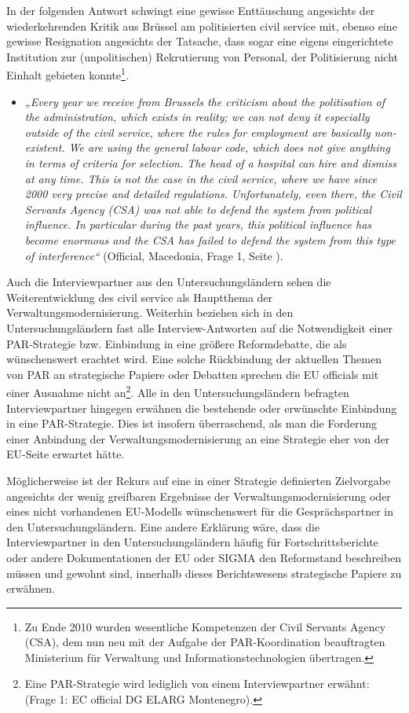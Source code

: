 In der folgenden Antwort schwingt eine gewisse Enttäuschung angesichts der wiederkehrenden Kritik aus Brüssel am politisierten civil service mit, ebenso eine gewisse Resignation angesichts der Tatsache, dass sogar eine eigens eingerichtete Institution zur (unpolitischen) Rekrutierung von Personal, der Politisierung nicht Einhalt gebieten konnte\footnote{Zu Ende 2010 wurden wesentliche Kompetenzen der Civil Servants Agency (CSA), dem nun neu mit der Aufgabe der PAR-Koordination beauftragten Ministerium für Verwaltung und Informationstechnologien übertragen.}. 
\begin{itemize}[label={}]
\item \textit{„Every year we receive from Brussels the criticism about the politisation of the administration, which exists in reality; we can not deny it especially outside of the civil service, where the rules for employment are basically non-existent. We are using the general labour code, which does not give anything in terms of criteria for selection. The head of a hospital can hire and dismiss at any time. This is not the case in the civil service, where we have since 2000 very precise and detailed regulations. Unfortunately, even there, the Civil Servants Agency (CSA) was not able to defend the system from political influence. In particular during the past years, this political influence has become enormous and the CSA has failed to defend the system from this type of interference“} (Official, Macedonia, Frage 1, Seite \pageref{sec:par macedonia}).
\end{itemize}
Auch die Interviewpartner aus den Untersuchungsländern sehen die Weiterentwicklung des civil service als Hauptthema der Verwaltungsmodernisierung. Weiterhin beziehen sich in den Untersuchungsländern fast alle Interview-Antworten auf die Notwendigkeit einer PAR-Strategie bzw. Einbindung in eine größere Reformdebatte, die als wünschenswert erachtet wird. Eine solche Rückbindung der aktuellen Themen von PAR an strategische Papiere oder Debatten sprechen die EU officials mit einer Ausnahme nicht an\footnote{Eine PAR-Strategie wird lediglich von einem Interviewpartner erwähnt: (Frage 1: EC official DG ELARG Montenegro).}. Alle in den Untersuchungsländern befragten Interviewpartner hingegen erwähnen die bestehende oder erwünschte Einbindung in eine PAR-Strategie. Dies ist insofern überraschend, als man die Forderung einer Anbindung der Verwaltungsmodernisierung an eine Strategie eher von der EU-Seite erwartet hätte.\par
Möglicherweise ist der Rekurs auf eine in einer Strategie definierten Zielvorgabe angesichts der wenig greifbaren Ergebnisse der Verwaltungsmodernisierung oder eines nicht vorhandenen EU-Modells wünschenswert für die Gesprächspartner in den Untersuchungsländern. Eine andere Erklärung wäre, dass die Interviewpartner in den Untersuchungsländern häufig für Fortschrittsberichte oder andere Dokumentationen der EU oder SIGMA den Reformstand beschreiben müssen und gewohnt sind, innerhalb dieses Berichtswesens strategische Papiere zu erwähnen.\par
